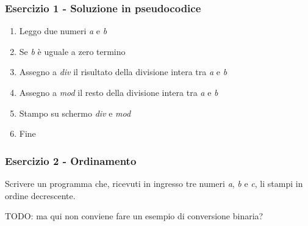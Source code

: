\documentclass[]{beamer}
\begin{document}
\begin{frame}
\frametitle{Esercizio 1 - Soluzione in pseudocodice}
\begin{enumerate}
	\item Leggo due numeri \emph{a} e \emph{b}
	\item Se \emph{b} è uguale a zero termino
	\item Assegno a \emph{div} il risultato della divisione intera tra \emph{a} e \emph{b}
	\item Assegno a \emph{mod} il resto della divisione intera tra \emph{a} e \emph{b}
	\item Stampo su schermo \emph{div} e \emph{mod}
	\item Fine
\end{enumerate}
\end{frame}

\iffalse
\begin{frame}
\frametitle{Esercizio 2 - Ordinamento}
Scrivere un programma che, ricevuti in ingresso tre numeri \emph{a}, \emph{b} e \emph{c}, li stampi in ordine decrescente.

TODO: ma qui non conviene fare un esempio di conversione binaria?
\end{frame}
\end{document}
